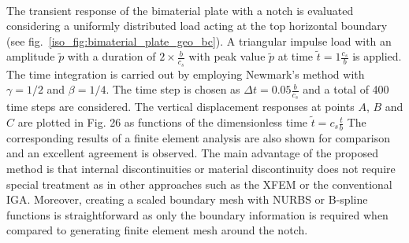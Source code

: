 \paragraph{}
The transient response of the bimaterial plate with a notch is evaluated considering a uniformly distributed load acting at the top horizontal boundary (see fig.~\ref{iso_fig:bimaterial_plate_geo_bc}).
A triangular impulse load with an amplitude $\widetilde{p}$ with a duration of $2 \times \frac{b}{c_s}$ with peak value $\widetilde{p}$ at time $\widetilde{t}=1\frac{c_s}{b}$ is applied.
The time integration is carried out by employing Newmark's method with $\gamma = 1/2$ and $\beta = 1/4$.
The time step is chosen as $\Delta t = 0.05\frac{b}{c_s}$ and a total of 400 time steps are considered.
The vertical displacement responses at points $A$, $B$ and $C$ are plotted in Fig. 26 as functions of the dimensionless time $\widetilde{t} = c_s\frac{t}{b}$
The corresponding results of a finite element analysis are also shown for comparison and an excellent agreement is observed.
The main advantage of the proposed method is that internal discontinuities or material discontinuity does not require special treatment as in other approaches such as the XFEM or the conventional IGA.
Moreover, creating a scaled boundary mesh with NURBS or B-spline functions is straightforward as only the boundary information is required when compared to generating finite element mesh around the notch.
